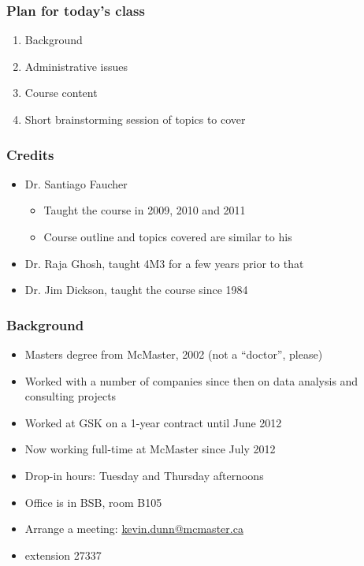 
\begin{frame}\frametitle{Plan for today's class}
	\begin{enumerate}
		\item	Background
		\item	Administrative issues
		\item	Course content
		\item	Short brainstorming session of topics to cover
	\end{enumerate}
\end{frame}

\begin{frame}\frametitle{Credits}
	
	\begin{itemize}
		\item	Dr. Santiago Faucher
		\begin{itemize}
			\item	Taught the course in 2009, 2010 and 2011
			\item	Course outline and topics covered are similar to his
		\end{itemize}
		\item	Dr. Raja Ghosh, taught 4M3 for a few years prior to that
		\item	Dr. Jim Dickson, taught the course since 1984
	\end{itemize}	
\end{frame}

\begin{frame}\frametitle{Background}
	\begin{itemize}
		\item	Masters degree from McMaster, 2002 (not a ``doctor'', please)
		\item	Worked with a number of companies since then on data analysis and consulting projects
		\item	Worked at GSK on a 1-year contract until June 2012		
		\item	Now working full-time at McMaster since July 2012
		\item	Drop-in hours: Tuesday and Thursday afternoons
		\item	Office is in BSB, room B105
		\item	Arrange a meeting: \url{kevin.dunn@mcmaster.ca}
		\item	extension 27337
	\end{itemize}	
\end{frame}


